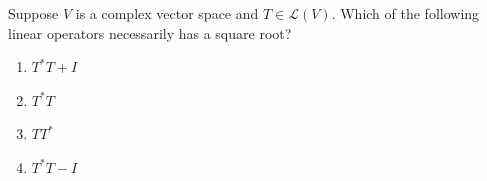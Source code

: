 \documentclass{article}
\begin{document}
\noindent
\begin{minipage}{0.65\linewidth}
Suppose $V$ is a complex vector space and $T \in \mathcal{L}(V)$. Which of the following linear operators necessarily has a square root?
\end{minipage}

\begin{enumerate}
  \item $T^*T + I$
  \item $T^*T$
  \item $TT^*$
  \item $T^*T - I$
\end{enumerate}
\end{document}

